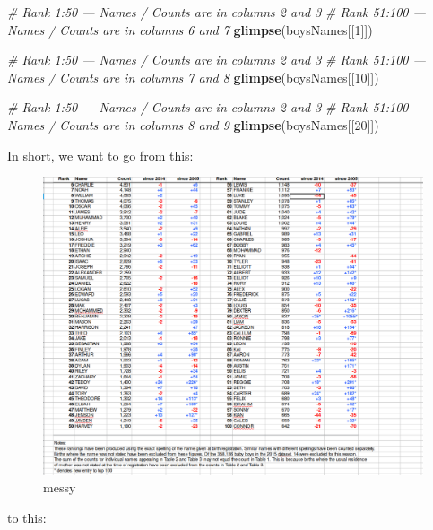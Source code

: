 \documentclass[]{book}
\newenvironment{Shaded}{\begin{snugshade}}{\end{snugshade}}
\newcommand{\KeywordTok}[1]{\textcolor[rgb]{0.13,0.29,0.53}{\textbf{#1}}}
\newcommand{\DecValTok}[1]{\textcolor[rgb]{0.00,0.00,0.81}{#1}}
\newcommand{\CommentTok}[1]{\textcolor[rgb]{0.56,0.35,0.01}{\textit{#1}}}
\newcommand{\NormalTok}[1]{#1}
\begin{document}
\begin{Shaded}
\begin{Highlighting}[]
\CommentTok{# Rank 1:50 --- Names / Counts are in columns 2 and 3 }
\CommentTok{# Rank 51:100 --- Names / Counts are in columns 6 and 7}
\KeywordTok{glimpse}\NormalTok{(boysNames[[}\DecValTok{1}\NormalTok{]]) }

\CommentTok{# Rank 1:50 --- Names / Counts are in columns 2 and 3 }
\CommentTok{# Rank 51:100 --- Names / Counts are in columns 7 and 8}
\KeywordTok{glimpse}\NormalTok{(boysNames[[}\DecValTok{10}\NormalTok{]]) }

\CommentTok{# Rank 1:50 --- Names / Counts are in columns 2 and 3 }
\CommentTok{# Rank 51:100 --- Names / Counts are in columns 8 and 9}
\KeywordTok{glimpse}\NormalTok{(boysNames[[}\DecValTok{20}\NormalTok{]]) }
\end{Highlighting}
\end{Shaded}

In short, we want to go from this:

\begin{figure}
\centering
\includegraphics{R/RDataWrangling/images/messy.png}
\caption{messy}
\end{figure}

to this:
\end{document}
